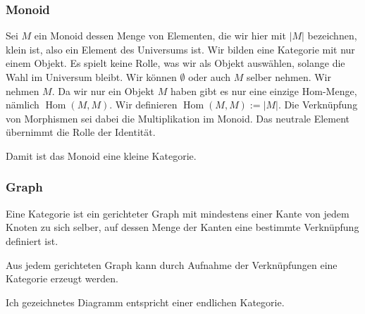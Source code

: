 \documentclass[a4paper]{amsart}
\theoremstyle{definition}
\DeclareMathOperator{\Hom}{Hom}
\begin{document}
\subsubsection{Monoid}
Sei $M$ ein Monoid dessen Menge von Elementen, die wir hier mit $|M|$ bezeichnen, klein ist, also ein Element des Universums ist. Wir bilden eine Kategorie mit nur einem Objekt. Es spielt keine Rolle, was wir als Objekt auswählen, solange die Wahl im Universum bleibt. Wir können $\emptyset$ oder auch $M$ selber nehmen. Wir nehmen $M$. Da wir nur ein Objekt $M$ haben gibt es nur eine einzige Hom-Menge, nämlich $\Hom( M, M )$. Wir definieren $\Hom( M, M ) := |M|$. Die Verknüpfung von Morphismen sei dabei die Multiplikation im Monoid. Das neutrale Element übernimmt die Rolle der Identität.

Damit ist das Monoid eine kleine Kategorie.

\subsubsection{Graph}
Eine Kategorie ist ein gerichteter Graph mit mindestens einer Kante von jedem Knoten zu sich selber, auf dessen Menge der Kanten eine bestimmte Verknüpfung definiert ist.

Aus jedem gerichteten Graph kann durch Aufnahme der Verknüpfungen eine Kategorie erzeugt werden.

Ich gezeichnetes Diagramm entspricht einer endlichen Kategorie.

\end{document}
